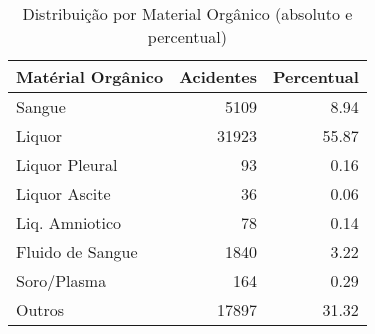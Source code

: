 \begin{table}
\caption{Distribuição por Material Orgânico (absoluto e percentual)}
\begin{tabular}{lrr}
\toprule
Matérial Orgânico & Acidentes & Percentual \\
\midrule
Sangue & 5109 & 8.94 \\
Liquor & 31923 & 55.87 \\
Liquor Pleural & 93 & 0.16 \\
Liquor Ascite & 36 & 0.06 \\
Liq. Amniotico & 78 & 0.14 \\
Fluido de Sangue & 1840 & 3.22 \\
Soro/Plasma & 164 & 0.29 \\
Outros & 17897 & 31.32 \\
\bottomrule
\end{tabular}
\end{table}
